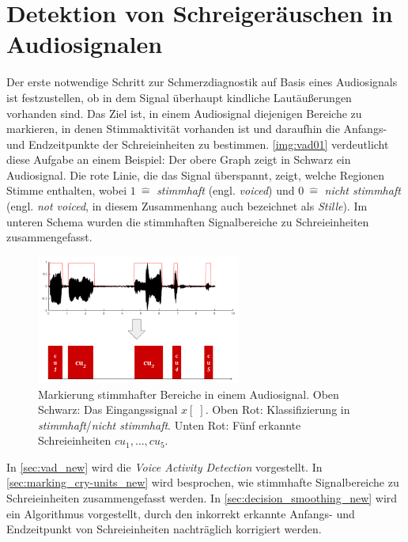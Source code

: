 \chapter{Detektion von Schreigeräuschen in Audiosignalen}
\label{sec:vad}

Der erste notwendige Schritt zur Schmerzdiagnostik auf Basis eines Audiosignals ist festzustellen, ob in dem Signal überhaupt kindliche Lautäußerungen vorhanden sind. Das Ziel ist, in einem Audiosignal diejenigen Bereiche zu markieren, in denen Stimmaktivität vorhanden ist und daraufhin die Anfangs- und Endzeitpunkte  der Schreieinheiten zu bestimmen. \autoref{img:vad01} verdeutlicht diese Aufgabe an einem Beispiel: Der obere Graph zeigt in Schwarz ein Audiosignal. Die rote Linie, die das Signal überspannt, zeigt, welche Regionen Stimme enthalten, wobei $1 \: \hat{=} $ \emph{stimmhaft} (engl. \emph{voiced}) und $0 \: \hat{=}  $ \emph{nicht stimmhaft} (engl. \emph{not voiced}, in diesem Zusammenhang auch bezeichnet als \emph{Stille}). Im unteren Schema wurden die stimmhaften Signalbereiche zu Schreieinheiten zusammengefasst.

\begin{figure}[h]
	\centering
	\includegraphics[width=0.6\textwidth]{bilder/vad_introduction02.png}
	\caption[Markierung stimmhafter Bereiche in einem Audiosignal]{Markierung stimmhafter Bereiche in einem Audiosignal. Oben Schwarz: Das Eingangssignal $x[\;]$. Oben Rot: Klassifizierung in \emph{stimmhaft}/\emph{nicht stimmhaft}. Unten Rot: Fünf erkannte Schreieinheiten $cu_1 , \ldots , cu_5$.}
	\label{img:vad01}
\end{figure}

In \autoref{sec:vad_new} wird die \emph{Voice Activity Detection} vorgestellt. In \autoref{sec:marking_cry-units_new} wird besprochen, wie stimmhafte Signalbereiche zu Schreieinheiten zusammengefasst werden. In \autoref{sec:decision_smoothing_new} wird ein Algorithmus vorgestellt, durch den inkorrekt erkannte Anfangs- und Endzeitpunkt von Schreieinheiten nachträglich korrigiert werden.

